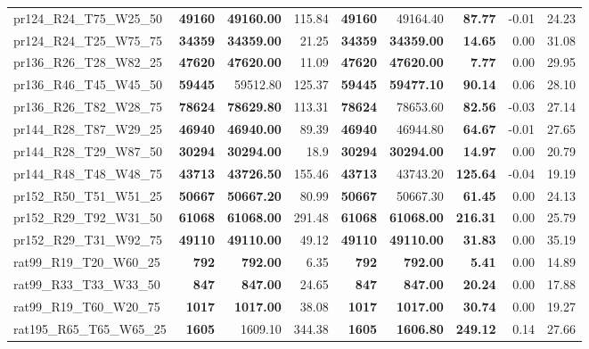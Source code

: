 \documentclass{singlecol-new}
\begin{document}
{\begin{longtable}{lrrrrrrrr}
		pr124\_R24\_T75\_W25\_50 & \textbf{49160} & \textbf{49160.00} & 115.84 & \textbf{49160} & 49164.40 & \textbf{87.77} & -0.01 & 24.23 \\
		pr124\_R24\_T25\_W75\_75 & \textbf{34359} & \textbf{34359.00} & 21.25 & \textbf{34359} & \textbf{34359.00} & \textbf{14.65} & 0.00 & 31.08 \\
		pr136\_R26\_T28\_W82\_25 & \textbf{47620} & \textbf{47620.00} & 11.09 & \textbf{47620} & \textbf{47620.00} & \textbf{7.77} & 0.00 & 29.95 \\
		pr136\_R46\_T45\_W45\_50 & \textbf{59445} & 59512.80 & 125.37 & \textbf{59445} & \textbf{59477.10} & \textbf{90.14} & 0.06 & 28.10 \\
		pr136\_R26\_T82\_W28\_75 & \textbf{78624} & \textbf{78629.80} & 113.31 & \textbf{78624} & 78653.60 & \textbf{82.56} & -0.03 & 27.14 \\
		pr144\_R28\_T87\_W29\_25 & \textbf{46940} & \textbf{46940.00} & 89.39 & \textbf{46940} & 46944.80 & \textbf{64.67} & -0.01 & 27.65 \\
		pr144\_R28\_T29\_W87\_50 & \textbf{30294} & \textbf{30294.00} & 18.9 & \textbf{30294} & \textbf{30294.00} & \textbf{14.97} & 0.00 & 20.79 \\
		pr144\_R48\_T48\_W48\_75 & \textbf{43713} & \textbf{43726.50} & 155.46 & \textbf{43713} & 43743.20 & \textbf{125.64} & -0.04 & 19.19 \\
		pr152\_R50\_T51\_W51\_25 & \textbf{50667} & \textbf{50667.20} & 80.99 & \textbf{50667} & 50667.30 & \textbf{61.45} & 0.00 & 24.13 \\
		pr152\_R29\_T92\_W31\_50 & \textbf{61068} & \textbf{61068.00} & 291.48 & \textbf{61068} & \textbf{61068.00} & \textbf{216.31} & 0.00 & 25.79 \\
		pr152\_R29\_T31\_W92\_75 & \textbf{49110} & \textbf{49110.00} & 49.12 & \textbf{49110} & \textbf{49110.00} & \textbf{31.83} & 0.00 & 35.19 \\
		rat99\_R19\_T20\_W60\_25 & \textbf{792} & \textbf{792.00} & 6.35 & \textbf{792} & \textbf{792.00} & \textbf{5.41} & 0.00 & 14.89 \\
		rat99\_R33\_T33\_W33\_50 & \textbf{847} & \textbf{847.00} & 24.65 & \textbf{847} & \textbf{847.00} & \textbf{20.24} & 0.00 & 17.88 \\
		rat99\_R19\_T60\_W20\_75 & \textbf{1017} & \textbf{1017.00} & 38.08 & \textbf{1017} & \textbf{1017.00} & \textbf{30.74} & 0.00 & 19.27 \\
		rat195\_R65\_T65\_W65\_25 & \textbf{1605} & 1609.10 & 344.38 & \textbf{1605} & \textbf{1606.80} & \textbf{249.12} & 0.14 & 27.66 \\

\end{longtable}}
\end{document}

